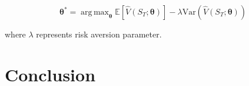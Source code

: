 \documentclass[12pt]{article}
\DeclareMathOperator*{\argmax}{arg\,max}
\begin{document}
\begin{equation}
\boldsymbol{\theta}^* = 
    \argmax_{\boldsymbol{\theta}} 
        \mathbb{E}\left[\hat{V}(S_T;\boldsymbol{\theta})\right] - 
        \lambda \text{Var}\left(\hat{V}(S_T;\boldsymbol{\theta})\right)
\end{equation}

where $\lambda$ represents risk aversion parameter.

\section{Conclusion}



\end{document}
